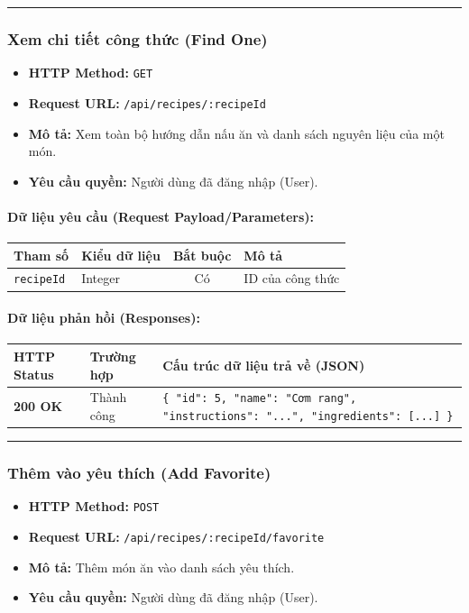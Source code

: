 \documentclass[12pt,a4paper]{article}
\begin{document}
\vskip 0.4cm
\noindent\rule{\textwidth}{0.3pt}
\vskip 0.4cm

\subsubsection{Xem chi tiết công thức (Find One)}
\begin{itemize}[leftmargin=*]
    \item \textbf{HTTP Method:} \texttt{GET}
    \item \textbf{Request URL:} \texttt{/api/recipes/:recipeId}
    \item \textbf{Mô tả:} Xem toàn bộ hướng dẫn nấu ăn và danh sách nguyên liệu của một món.
    \item \textbf{Yêu cầu quyền:} Người dùng đã đăng nhập (User).
\end{itemize}

\paragraph{Dữ liệu yêu cầu (Request Payload/Parameters):}
\begin{longtable}{|>{\raggedright\arraybackslash}p{2.8cm}|>{\raggedright\arraybackslash}p{2.2cm}|c|>{\raggedright\arraybackslash}p{7.0cm}|}
\hline
\textbf{Tham số} & \textbf{Kiểu dữ liệu} & \textbf{Bắt buộc} & \textbf{Mô tả} \\ \hline
\endhead
\texttt{recipeId} & Integer & Có & ID của công thức \\ \hline
\end{longtable}

\paragraph{Dữ liệu phản hồi (Responses):}
\begin{longtable}{|>{\raggedright\arraybackslash}p{2.8cm}|>{\raggedright\arraybackslash}p{3.2cm}|>{\raggedright\arraybackslash}p{8.0cm}|}
\hline
\textbf{HTTP Status} & \textbf{Trường hợp} & \textbf{Cấu trúc dữ liệu trả về (JSON)} \\ \hline
\endhead
\textbf{200 OK} & Thành công & \texttt{\{ "id": 5, "name": "Cơm rang", "instructions": "...", "ingredients": [...] \}} \\ \hline
\end{longtable}

\vskip 0.4cm
\noindent\rule{\textwidth}{0.3pt}
\vskip 0.4cm

\subsubsection{Thêm vào yêu thích (Add Favorite)}
\begin{itemize}[leftmargin=*]
    \item \textbf{HTTP Method:} \texttt{POST}
    \item \textbf{Request URL:} \texttt{/api/recipes/:recipeId/favorite}
    \item \textbf{Mô tả:} Thêm món ăn vào danh sách yêu thích.
    \item \textbf{Yêu cầu quyền:} Người dùng đã đăng nhập (User).
\end{itemize}
\end{document}
